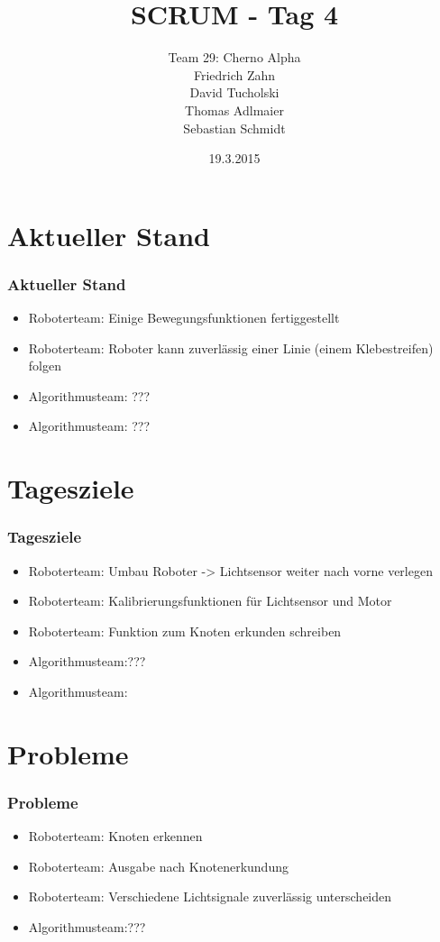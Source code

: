 \documentclass[ddcfooter,nototalpage]{tudbeamer}
\begin{document}
\title{SCRUM - Tag 4}
\author{Team 29: Cherno Alpha \\
Friedrich Zahn \\
David Tucholski \\
Thomas Adlmaier \\
Sebastian Schmidt
}
\date{19.3.2015}
\maketitle
\section{Aktueller Stand}
\begin{frame}
\frametitle{Aktueller Stand}
\normalsize
\begin{itemize}
\item Roboterteam: Einige Bewegungsfunktionen fertiggestellt
\item Roboterteam: Roboter kann zuverlässig einer Linie (einem Klebestreifen) folgen
\item Algorithmusteam: ???
\item Algorithmusteam: ???
\end{itemize}
\end{frame}
\section{Tagesziele}
\begin{frame}
\frametitle{Tagesziele}
\normalsize
\begin{itemize}
\item Roboterteam: Umbau Roboter -> Lichtsensor weiter nach vorne  verlegen
\item Roboterteam: Kalibrierungsfunktionen für Lichtsensor und Motor
\item Roboterteam: Funktion zum Knoten erkunden schreiben
\item Algorithmusteam:???
\item Algorithmusteam:
\end{itemize}
\end{frame}
\section{Probleme}
\begin{frame}
\frametitle{Probleme}
\normalsize
\begin{itemize}
\item Roboterteam: Knoten erkennen
\item Roboterteam: Ausgabe nach Knotenerkundung
\item Roboterteam: Verschiedene Lichtsignale zuverlässig unterscheiden
\item Algorithmusteam:???
\end{itemize}
\end{frame}
\end{document}
